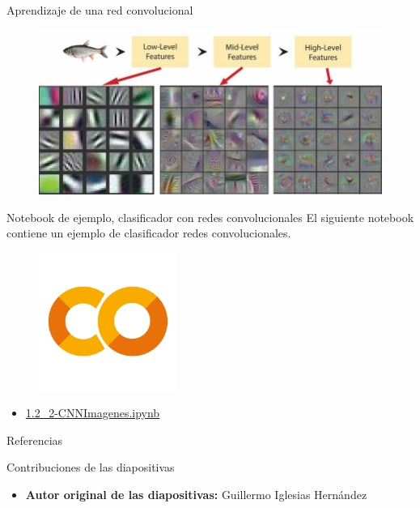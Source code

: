 \begin{frame}{Aprendizaje de una red convolucional}
\begin{figure}
    \centering
    \includegraphics[width=\textwidth]{Slides/figures/Tema 3/ConvHierarchy.png}
    \caption{\cite{siddiqui2018automatic}}
\end{figure}
\end{frame}

\begin{frame}{Notebook de ejemplo, clasificador con redes convolucionales}
El siguiente notebook contiene un ejemplo de clasificador redes convolucionales.

\begin{figure}
    \centering
    \includegraphics[width=0.4\textwidth]{Slides/figures/GoogleColab.png}
\end{figure}
\begin{itemize}
    \centering
    \item {\Large \href{https://colab.research.google.com/drive/19TfnBBgbAEDG4YC7EGwcJ6ETZi-xfAiL?usp=sharing}{1.2\_2-CNNImagenes.ipynb}}
\end{itemize}
\end{frame}


\begin{frame}[allowframebreaks]{Referencias}
    
    
\end{frame}

\begin{frame}{Contribuciones de las diapositivas}
\begin{itemize}
    \item \textbf{Autor original de las diapositivas:} Guillermo Iglesias Hernández
\end{itemize}
\end{frame}

